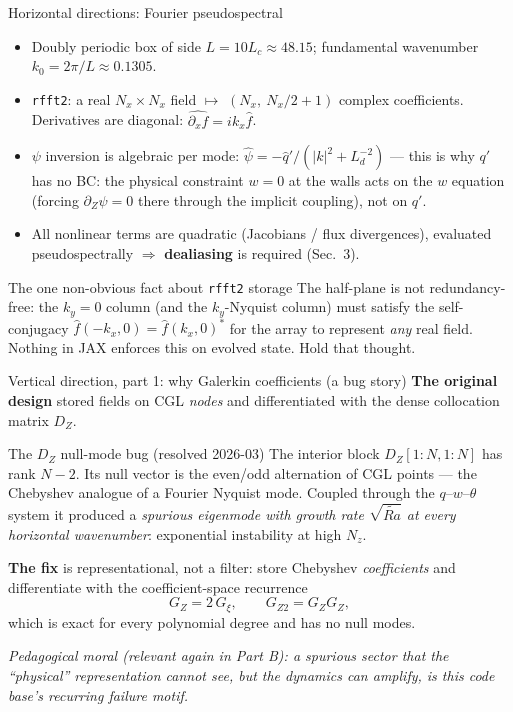 \documentclass[aspectratio=169,10pt]{beamer}
\newcommand{\Rat}{\widetilde{Ra}}
\newcommand{\Ld}{L_d}
\newcommand{\dZ}{\partial_Z}
\begin{document}
\begin{frame}{Horizontal directions: Fourier pseudospectral}
  \begin{itemize}
    \item Doubly periodic box of side $L = 10 L_c \approx 48.15$;
      fundamental wavenumber $k_0 = 2\pi/L \approx 0.1305$.
    \item \texttt{rfft2}: a real $N_x\times N_x$ field $\mapsto$
      $(N_x,\ N_x/2{+}1)$ complex coefficients. Derivatives are diagonal:
      $\widehat{\partial_x f} = i k_x \hat f$.
    \item $\psi$ inversion is algebraic per mode:
      $\hat\psi = -\hat q'/(|k|^2 + \Ld^{-2})$ --- this is why $q'$ has no BC:
      the physical constraint $w=0$ at the walls acts on the $w$ equation
      (forcing $\dZ\psi=0$ there through the implicit coupling), not on $q'$.
    \item All nonlinear terms are quadratic (Jacobians / flux divergences),
      evaluated pseudospectrally $\Rightarrow$ \textbf{dealiasing} is required (Sec.~3).
  \end{itemize}
  \begin{block}{The one non-obvious fact about \texttt{rfft2} storage}
    The half-plane is not redundancy-free: the $k_y=0$ column (and the $k_y$-Nyquist
    column) must satisfy the self-conjugacy
    $\hat f(-k_x,0) = \hat f(k_x,0)^{*}$ for the array to represent \emph{any}
    real field. Nothing in JAX enforces this on evolved state. Hold that thought.
  \end{block}
\end{frame}

\begin{frame}{Vertical direction, part 1: why Galerkin coefficients (a bug story)}
  \textbf{The original design} stored fields on CGL \emph{nodes} and differentiated
  with the dense collocation matrix $D_Z$.
  \begin{alertblock}{The $D_Z$ null-mode bug (resolved 2026-03)}
    The interior block $D_Z[1{:}N,1{:}N]$ has rank $N-2$. Its null vector is the
    even/odd alternation of CGL points --- the Chebyshev analogue of a Fourier
    Nyquist mode. Coupled through the $q$--$w$--$\theta$ system it produced a
    \emph{spurious eigenmode with growth rate $\sqrt{\Rat}$ at every horizontal
    wavenumber}: exponential instability at high $N_z$.
  \end{alertblock}
  \textbf{The fix} is representational, not a filter: store Chebyshev
  \emph{coefficients} and differentiate with the coefficient-space recurrence
  \[
    G_Z = 2\,G_\xi, \qquad G_{Z2} = G_Z G_Z,
  \]
  which is exact for every polynomial degree and has no null modes.
  \medskip

  \emph{Pedagogical moral (relevant again in Part B): a spurious sector that the
  ``physical'' representation cannot see, but the dynamics can amplify, is this
  code base's recurring failure motif.}
\end{frame}
\end{document}

